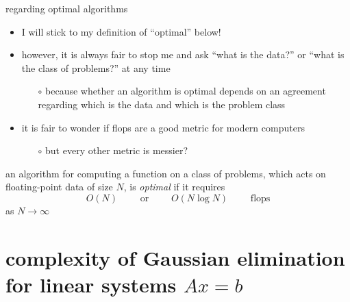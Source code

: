 \documentclass[10pt,
               svgnames,
               hyperref={colorlinks,citecolor=DeepPink4,linkcolor=FireBrick,urlcolor=Maroon},
               usepdftitle=false]{beamer}
\newcommand{\optimaldef}{
\begin{definition}
an algorithm for computing a function on a class of problems, which acts on floating-point data of size $N$, is \emph{optimal} if it requires
   $$O(N) \qquad \text{ or } \qquad O(N\log N) \qquad \text{ flops}$$
as $N\to\infty$
\end{definition}
}
\begin{document}
\begin{frame}{regarding optimal algorithms}

\begin{itemize}
\item I will stick to my definition of ``optimal'' below!
\item<2-> however, it is \alert{always} fair to stop me and ask ``what is the data?'' or ``what is the class of problems?'' at any time
    \begin{itemize}
    \item[$\circ$] because whether an algorithm is optimal depends on an agreement regarding which is the data and which is the problem class
    \end{itemize}
\item<3-> it is fair to wonder if flops are a good metric for modern computers
    \begin{itemize}
    \item[$\circ$] but every other metric is messier?
    \end{itemize}
\end{itemize}

\optimaldef
\end{frame}



\section{complexity of Gaussian elimination for linear systems $Ax=b$}
\end{document}
